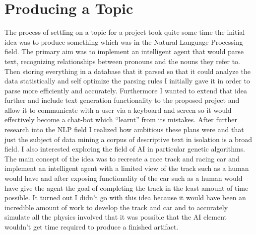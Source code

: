 \documentclass{report}
\begin{document}
\section{Producing a Topic}
The process of settling on a topic for a project took quite some time the initial idea was to produce something which was in the Natural Language Processing field. The primary aim was to implement an intelligent agent that would parse text, recognizing relationships between pronouns and the nouns they refer to. Then storing everything in a database that it parsed so that it could analyze the data statistically and self optimize the parsing rules I initially gave it in order to parse more efficiently and accurately. Furthermore I wanted to extend that idea further and include text generation functionality to the proposed project and allow it to communicate with a user via a keyboard and screen so it would effectively become a chat-bot which ``learnt'' from its mistakes. After further research into the NLP field I realized how ambitious these plans were and that just the subject of data mining a corpus of descriptive text in isolation is a broad field. I also interested exploring the field of AI in particular genetic algorithms. The main concept of the idea was to recreate a race track and racing car and implement an intelligent agent with a limited view of the track such as a human would have and after exposing functionality of the car such as a human would have give the agent the goal of completing the track in the least amount of time possible. It turned out I didn't go with this idea because it would have been an incredible amount of work to develop the track and car and to accurately simulate all the physics involved that it was possible that the AI element wouldn't get time required to produce a finished artifact.
\end{document}

